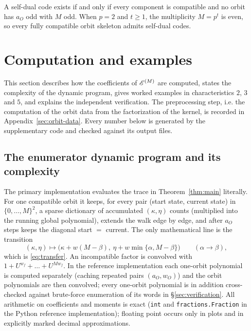 \begin{corollary}\label{cor:self-dual}
A self-dual code exists if and only if every component is compatible and no
orbit has $a_O$ odd with $M$ odd.  When $p=2$ and $t\geq1$, the multiplicity
$M=p^t$ is even, so every fully compatible orbit skeleton admits self-dual
codes.
\end{corollary}

\section{Computation and examples}\label{sec:examples}

This section describes how the coefficients of $\mathscr E^{(M)}$ are computed,
states the complexity of the dynamic program, gives worked examples in
characteristics $2$, $3$ and $5$, and explains the independent verification.
The preprocessing step, i.e. the computation of the orbit data from the
factorization of the kernel, is recorded in Appendix~\ref{sec:orbit-data}.  Every number below is generated by the
supplementary code and checked against its output files.

\subsection{The enumerator dynamic program and its complexity}
\label{sec:dp}

The primary implementation evaluates the trace in
Theorem~\ref{thm:main} literally.  For one compatible orbit it keeps, for
every pair (start state, current state) in $\{0,\ldots,M\}^2$, a sparse
dictionary of accumulated $(\kappa,\eta)$ counts (multiplied into the running
global polynomial), extends the walk edge by edge, and after $a_O$ steps keeps
the diagonal start $=$ current.  The only mathematical line is the transition
\[
(\kappa,\eta)\longmapsto
 \bigl(\kappa+w(M-\beta),\ \eta+w\min\{\alpha,M-\beta\}\bigr)
 \qquad(\alpha\to\beta),
\]
which is \eqref{eq:transfer}.  An incompatible factor is convolved with
$1+U^{w_f}+\dots+U^{Mw_f}$.  In the reference implementation each one-orbit polynomial is
computed separately (caching repeated pairs $(a_O,w_O)$) and the orbit
polynomials are then convolved; every one-orbit polynomial is in addition
cross-checked against brute-force enumeration of its words in
\S\ref{sec:verification}.  All arithmetic on
coefficients and moments is exact (\texttt{int} and
\texttt{fractions.Fraction} in the Python reference implementation); floating
point occurs only in plots and in explicitly marked decimal approximations.

